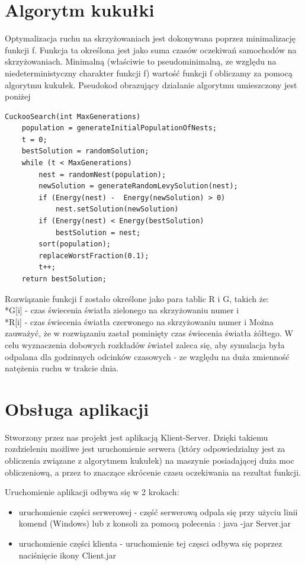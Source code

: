 \documentclass{article}
\begin{document}
\section{Algorytm kukułki}
    Optymalizacja ruchu na skrzyżowaniach jest dokonywana poprzez minimalizację funkcji f. Funkcja ta określona jest jako suma czasów oczekiwań samochodów na skrzyżowaniach. Minimalną (właściwie to pseudominimalną, ze względu na niedeterministyczny charakter funkcji f) wartość funkcji f obliczamy za pomocą algorytmu kukułek. Pseudokod obrazujący działanie algorytmu umieszczony jest poniżej

\begin{lstlisting}
CuckooSearch(int MaxGenerations)
    population = generateInitialPopulationOfNests;
    t = 0;
    bestSolution = randomSolution;
    while (t < MaxGenerations)
        nest = randomNest(population);
        newSolution = generateRandomLevySolution(nest);
        if (Energy(nest) -  Energy(newSolution) > 0)
            nest.setSolution(newSolution)
        if (Energy(nest) < Energy(bestSolution)
            bestSolution = nest;
        sort(population);
        replaceWorstFraction(0.1);
        t++;
    return bestSolution;
\end{lstlisting}

Rozwiązanie funkcji f zostało określone jako para tablic R i G, takich że: 
\\*G[i]  - czas świecenia światła zielonego na skrzyżowaniu numer i
\\*R[i]  - czas świecenia światła czerwonego na skrzyżowaniu numer i
Można zauważyć, że w rozwiązaniu zastał pominięty czas świecenia światła żółtego.
W celu wyznaczenia dobowych rozkładów świateł zaleca się, aby symulacja była odpalana dla godzinnych odcinków czasowych - ze względu na duża zmienność natężenia ruchu w trakcie dnia. 

\section{Obsługa aplikacji}
  Stworzony przez nas projekt jest aplikacją Klient-Server. Dzięki takiemu rozdzieleniu możliwe jest uruchomienie serwera (który odpowiedzialny jest za obliczenia związane z algorytmem kukułek) na maszynie posiadającej duża moc obliczeniową, a przez to znaczące skrócenie czasu oczekiwania na rezultat funkcji.

Uruchomienie aplikacji odbywa się w 2 krokach:
\begin{itemize}
\item uruchomienie części serwerowej - część serwerową odpala się przy użyciu linii komend (Windows) lub z konsoli za pomocą polecenia : java -jar Server.jar
\item uruchomienie części klienta - uruchomienie tej częsci odbywa się poprzez naciśnięcie ikony Client.jar
\end{itemize}
\end{document}

